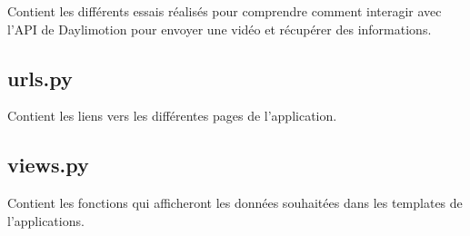 Contient les différents essais réalisés pour comprendre comment interagir avec l'API de Daylimotion pour envoyer une vidéo et récupérer des informations.

\subsection{urls.py}

Contient les liens vers les différentes pages de l'application.

\subsection{views.py}

Contient les fonctions qui afficheront les données souhaitées dans les templates de l'applications.
